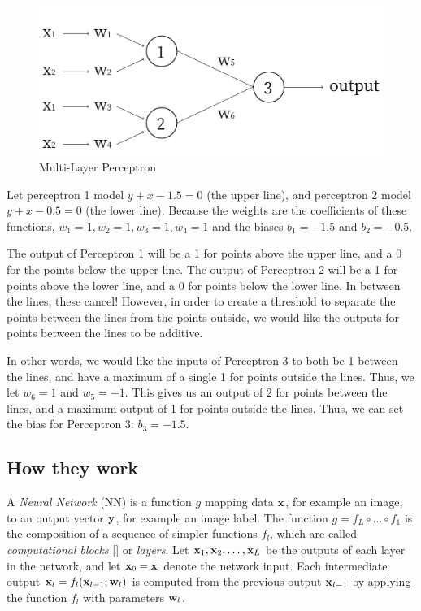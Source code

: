 \begin{figure}[H]
	\centering
	\includegraphics[scale=0.3]{images/Frame}
	\caption{Multi-Layer Perceptron}
	\label{f:Frame}
\end{figure}

Let perceptron 1 model $y + x - 1.5 = 0$ (the upper line), and perceptron 2 model $y + x - 0.5 = 0$ (the lower line). Because the weights are the coefficients of these functions, $w_1 = 1, w_2 = 1, w_3 = 1, w_4 = 1$ and the biases $b_1 = -1.5$ and $b_2 = -0.5$.

The output of Perceptron 1 will be a 1 for points above the upper line, and a 0 for the points below the upper line. The output of Perceptron 2 will be a 1 for points above the lower line, and a 0 for points below the lower line. In between the lines, these cancel! However, in order to create a threshold to separate the points between the lines from the points outside, we would like the outputs for points between the lines to be additive.

In other words, we would like the inputs of Perceptron 3 to both be 1 between the lines, and have a maximum of a single 1 for points outside the lines. Thus, we let $w_6 = 1$ and $w_5 = -1$. This gives us an output of $2$ for points between the lines, and a maximum output of 1 for points outside the lines. Thus, we can set the bias for Perceptron 3: $b_3 = -1.5$.


\subsection{How they work}\label{s:cnn-structure}

A \emph{Neural Network} (NN) is a function $g$ mapping data $\mathbf{x}$, for example an image, to an output vector $\mathbf{y}$, for example an image label. The function $g=f_L \circ \dots \circ f_1$ is the composition of a sequence of simpler functions $f_l$, which are called \emph{computational blocks} [] or \emph{layers}. Let $\mathbf{x}_1,\mathbf{x}_2,\dots,\mathbf{x}_L$ be the outputs of each layer in the network, and let $\mathbf{x}_0=\mathbf{x}$ denote the network input. Each intermediate output $\mathbf{x}_l = f_l(\mathbf{x}_{l-1};\mathbf{w}_l)$ is computed from the previous output $\mathbf{x}_{l-1}$  by applying the function $f_l$ with parameters $\mathbf{w}_l$. 

